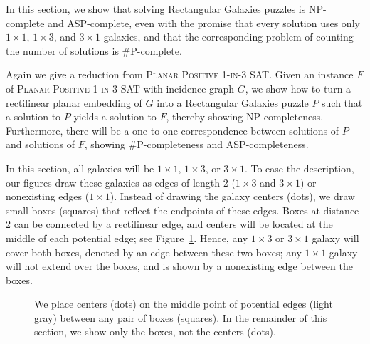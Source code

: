 In this section, we show that solving %
Rectangular Galaxies puzzles is NP-complete and ASP-complete, even with the promise that every solution uses only $1\times 1$, $1\times 3$, and $3\times 1$ galaxies, and that the corresponding problem of counting the number of solutions is \#P-complete. %
\iffalse
\begin{theorem}\label{th:sgr13}
	Determining whether a Spiral Galaxies puzzle is solvable with only  $1\times 1$, $1\times 3$, and $3\times 1$ galaxies is NP-complete and ASP-complete, and counting the number of solutions is \#P-complete.
\end{theorem}
\fi
Again we give a reduction from \textsc{Planar Positive 1-in-3 SAT}.
Given an instance $F$ of \textsc{Planar Positive 1-in-3 SAT} with incidence graph $G$, we show how to turn a rectilinear planar embedding of $G$ into a Rectangular Galaxies puzzle $P$ such that a solution to $P$ yields a solution to $F$, thereby showing NP-completeness. Furthermore, there will be a one-to-one correspondence between solutions of $P$ and solutions of $F$, showing \#P-completeness and ASP-completeness. 

In this section, all galaxies will be $1\times 1$, $1\times 3$, or $3\times 1$.
To ease the description, our figures draw these galaxies as edges of length 2 ($1\times 3$ and $3\times 1$) or nonexisting edges ($1\times 1$).
Instead of drawing the galaxy centers (dots), we draw small boxes (squares) that reflect the endpoints of these edges.
Boxes at distance 2 can be connected by a rectilinear edge, and centers will be located at the middle of each potential edge; see Figure~\ref{fig:3-1-disks-and-centers}.
Hence, any $1\times 3$ or $3\times 1$ galaxy will cover both boxes, denoted by an edge between these two boxes; any $1\times 1$ galaxy will not extend over the boxes, and is shown by a nonexisting edge between the boxes.

\begin{figure}
\centering
{}
  \caption{\small We place centers (dots) on the middle point of potential edges (light gray) between any pair of boxes (squares). In the remainder of this section, we show only the boxes, not the centers (dots). }
  \label{fig:3-1-disks-and-centers}
\end{figure}

